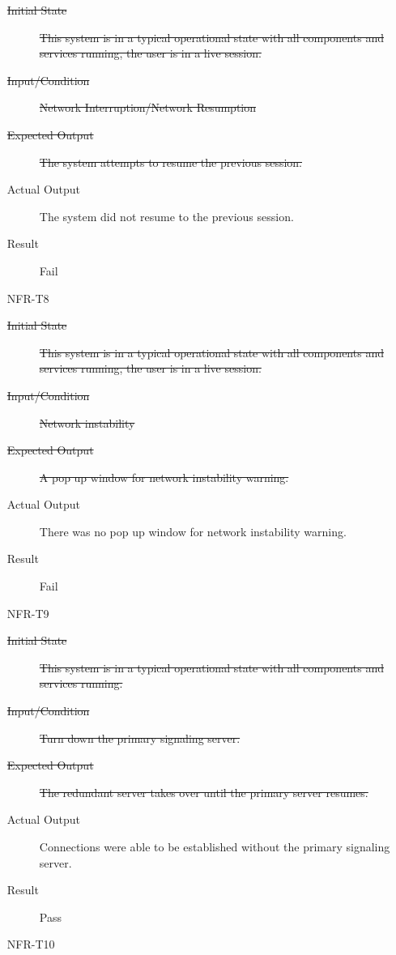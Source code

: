 \documentclass[12pt, titlepage]{article}
\begin{document}
\begin{enumerate}
\begin{description}
      \item[\sout{Initial State}]\sout{ This system is in a typical operational state with all
        components and services running, the user is in a live session.
      }
      \item[\sout{Input/Condition}]\sout{ Network Interruption/Network Resumption
      }
      \item[\sout{Expected Output}]\sout{ The system attempts to resume the previous session.
      }
      \item[Actual Output] The system did not resume to the previous session.
      \item[Result] Fail
      \end{description}
    \item[NFR-T8] \label{NFRT8}
      \begin{description}
      \item[\sout{Initial State}]\sout{ This system is in a typical operational state with all
        components and services running, the user is in a live session.
      }
      \item[\sout{Input/Condition}]\sout{ Network instability
      }
      \item[\sout{Expected Output}]\sout{ A pop up window for network instability warning.
      }
      \item[Actual Output] There was no pop up window for network instability
        warning.
      \item[Result] Fail
      \end{description}
    \item[NFR-T9] \label{NFRT9}
      \begin{description}
      \item[\sout{Initial State}]\sout{ This system is in a typical operational state with all
        components and services running.
      }
      \item[\sout{Input/Condition}]\sout{ Turn down the primary signaling server.
      }
      \item[\sout{Expected Output}]\sout{ The redundant server takes over until the primary server
        resumes.
      }
      \item[Actual Output] Connections were able to be established without the
        primary signaling server.
      \item[Result] Pass
      \end{description}
    \item[NFR-T10] \label{NFRT10}
      \begin{description}

\end{description}
\end{enumerate}
\end{document}

